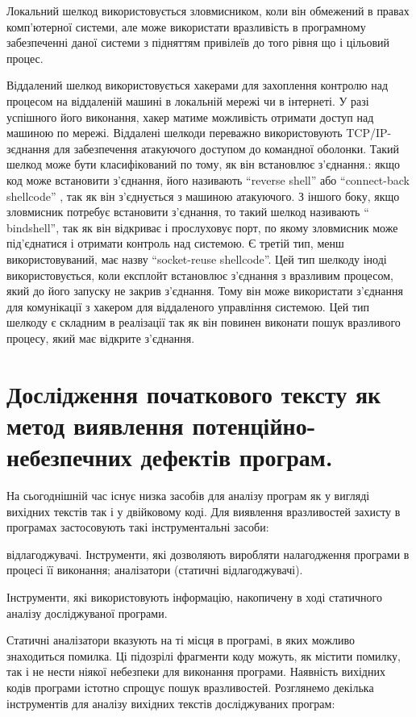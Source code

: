 Локальний шелкод використовується зловмисником, коли він обмежений в правах комп’ютерної системи, але може використати вразливість в програмному забезпеченні даної системи з підняттям привілеїв до того рівня що і цільовий процес.

Віддалений шелкод використовується хакерами для захоплення контролю над процесом на віддаленій машині в локальній мережі чи в інтернеті. У разі успішного його виконання, хакер матиме можливість отримати доступ над машиною по мережі. Віддалені шелкоди переважно використовують  TCP/IP-зєднання для забезпечення атакуючого доступом до командної оболонки. Такий шелкод може бути класифікований по тому, як він встановлює з’єднання.: якщо код може встановити з’єднання, його називають ``reverse shell'' або “connect-back shellcode”
, так як він з’єднується з машиною атакуючого. З іншого боку, якщо зловмисник потребує встановити з’єднання, то такий шелкод називають “ bindshell”, так як він відкриває і прослуховує порт, по якому зловмисник може під’єднатися і отримати контроль над системою. Є третій тип, менш використовуваний, має назву “socket-reuse shellcode”. Цей тип шелкоду іноді використовується, коли експлойт встановлює з’єднання з вразливим процесом, який до його запуску не закрив з’єднання. Тому він може використати з’єднання для комунікації з хакером для віддаленого управління системою. Цей тип шелкоду є складним в реалізації так як він повинен виконати пошук вразливого процесу, який має відкрите з’єднання.


\section{Дослідження початкового тексту як метод виявлення потенційно-небезпечних дефектів програм.}
\label{1section:id3}
На сьогоднішній час існує низка засобів для аналізу програм як у вигляді вихідних текстів так і у двійковому коді.
Для виявлення вразливостей захисту в програмах застосовують такі інструментальні засоби:
\begin{itemize}
 відлагоджувачі. Інструменти, які дозволяють виробляти налагодження програми в процесі її виконання;
 аналізатори (статичні відлагоджувачі).
\end{itemize}

Інструменти, які використовують інформацію, накопичену в ході статичного аналізу досліджуваної програми.

Статичні аналізатори вказують на ті місця в програмі, в яких можливо знаходиться помилка. Ці підозрілі фрагменти коду можуть, як містити помилку, так і не нести ніякої небезпеки для виконання програми. Наявність вихідних кодів програми істотно спрощує пошук вразливостей.
Розглянемо декілька інструментів для аналізу вихідних текстів досліджуваних програм:

